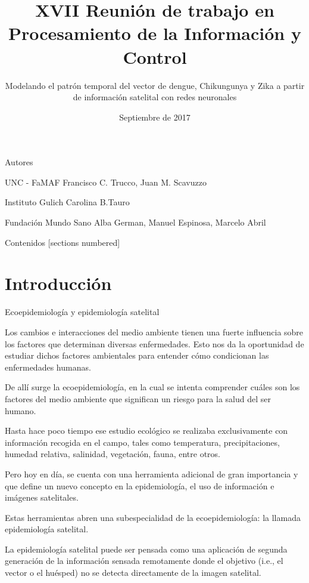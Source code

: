 \documentclass[10pt]{beamer}
\title{XVII Reunión de trabajo en Procesamiento de la Información y Control}
\subtitle{Modelando el patrón temporal del vector de dengue, Chikungunya y Zika a
  partir de información satelital con redes neuronales}
\date{Septiembre de 2017}
\begin{document}
\maketitle

\begin{frame}{Autores}
	\begin{alertblock}{UNC - FaMAF}
    Francisco C. Trucco, Juan M. Scavuzzo
	\end{alertblock}

	\begin{alertblock}{Instituto Gulich}
    Carolina B.Tauro
	\end{alertblock}

	\begin{alertblock}{Fundación Mundo Sano}
    Alba German, Manuel Espinosa, Marcelo Abril
	\end{alertblock}
\end{frame}

\begin{frame}{Contenidos}
  [sections numbered]
  \tableofcontents[hideallsubsections]
\end{frame}

\section{Introducción}

\begin{frame}{Ecoepidemiología y epidemiología satelital}

Los cambios e interacciones del medio ambiente tienen una fuerte influencia
sobre los factores que determinan diversas enfermedades. Esto nos da la
oportunidad de estudiar dichos factores ambientales para entender cómo
condicionan las enfermedades humanas.

De allí surge la ecoepidemiología, en la cual se intenta comprender cuáles son
los factores del medio ambiente que significan un riesgo para la salud del ser
humano.

Hasta hace poco tiempo ese estudio ecológico se realizaba exclusivamente con
información recogida en el campo, tales como temperatura, precipitaciones,
humedad relativa, salinidad, vegetación, fauna, entre otros.

Pero hoy en día, se cuenta con una herramienta adicional de gran importancia y
que define un nuevo concepto en la epidemiología, el uso de información e
imágenes satelitales.

Estas herramientas abren una subespecialidad de la ecoepidemiología: la llamada
epidemiología satelital.

La epidemiología satelital puede ser pensada como una aplicación de segunda
generación de la información sensada remotamente donde el objetivo (i.e., el
vector o el huésped) no se detecta directamente de la imagen satelital. 

\end{frame}
\end{document}
